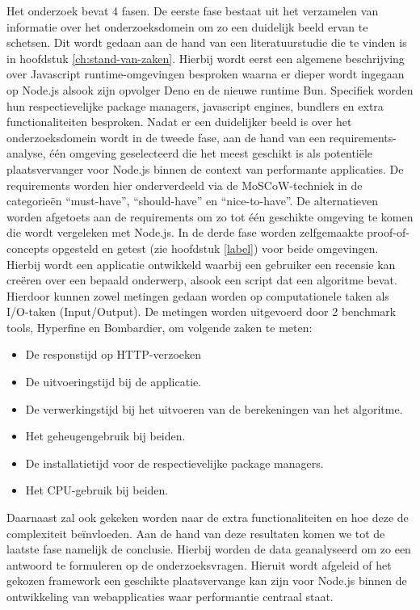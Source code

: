 Het onderzoek bevat 4 fasen. 
De eerste fase bestaat uit het verzamelen van informatie over het onderzoeksdomein om zo een duidelijk beeld ervan te schetsen.
Dit wordt gedaan aan de hand van een literatuurstudie die te vinden is in hoofdstuk \ref{ch:stand-van-zaken}. 
Hierbij wordt eerst een algemene beschrijving over Javascript runtime-omgevingen besproken waarna 
er dieper wordt ingegaan op Node.js alsook zijn opvolger Deno en de nieuwe runtime Bun. 
Specifiek worden hun respectievelijke package managers, javascript engines, bundlers en extra functionaliteiten besproken.
Nadat er een duidelijker beeld is over het onderzoeksdomein wordt in de tweede fase, aan de hand van een requirements-analyse, 
één omgeving geselecteerd die het meest geschikt is als potentiële plaatsvervanger voor Node.js binnen de context van performante applicaties.
De requirements worden hier onderverdeeld via de MoSCoW-techniek in de categorieën “must-have”, “should-have” en “nice-to-have”. 
De alternatieven worden afgetoets aan de requirements om zo tot één geschikte omgeving te komen die wordt vergeleken met Node.js.
In de derde fase worden zelfgemaakte proof-of-concepts opgesteld en getest (zie hoofdstuk \ref{label}) voor beide omgevingen. 
Hierbij wordt een applicatie ontwikkeld waarbij een gebruiker
een recensie kan creëren over een bepaald onderwerp,
alsook een script dat een algoritme bevat. Hierdoor kunnen zowel metingen gedaan worden op computationele taken als I/O-taken (Input/Output).
De metingen worden uitgevoerd door 2 benchmark tools, Hyperfine en Bombardier, om volgende zaken te meten:
\begin{itemize}
    \item De responstijd op HTTP-verzoeken
    \item De uitvoeringstijd bij de applicatie.
    \item De verwerkingstijd bij het uitvoeren van de berekeningen van het algoritme.
    \item Het geheugengebruik bij beiden.
    \item De installatietijd voor de respectievelijke package managers.
    \item Het CPU-gebruik bij beiden.
\end{itemize}
Daarnaast zal ook gekeken worden naar de extra functionaliteiten en hoe deze de complexiteit beïnvloeden.
Aan de hand van deze resultaten komen we tot de laatste fase namelijk de conclusie. 
Hierbij worden de data geanalyseerd om zo een antwoord te formuleren op de onderzoeksvragen.
Hieruit wordt afgeleid of het gekozen framework een geschikte plaatsvervange kan zijn voor Node.js binnen 
de ontwikkeling van webapplicaties waar performantie centraal staat.
